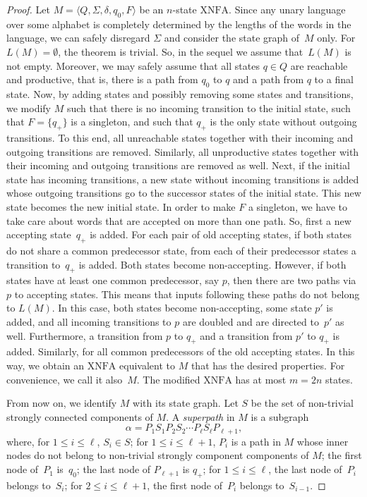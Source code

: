 \documentclass[final,copyright,noderivs]{eptcs}
\theoremstyle{plain}
\theoremstyle{definition}
\newcommand{\xnfa}{\textrm{XNFA}}
\begin{document}
\begin{proof}
Let $M=\langle Q,\Sigma,\delta,q_0,F\rangle$ be an $n$-state $\xnfa$.
Since any unary language over some alphabet is
completely determined by the lengths of the words in the language,
we can safely disregard $\Sigma$ and 
consider the state graph of~$M$ only. For $L(M)=\emptyset$, the theorem
is trivial. So, in the sequel we assume that~$L(M)$ is not empty.
Moreover, we may safely assume that all states $q\in Q$ are reachable and
productive, that is, there is a path from $q_0$ to $q$ and a path from
$q$ to a final state. Now, by adding states and possibly removing some states 
and transitions, we modify $M$ such that there is no incoming transition to 
the initial state, such that $F = \{q_+\}$ is a singleton, and such that $q_+$ is 
the only state without outgoing transitions. 
%
To this end, all unreachable states together with their incoming and outgoing transitions
are removed. Similarly, all unproductive states together with their incoming
and outgoing transitions
are removed as well. Next, if the initial state has incoming transitions, a
new state without incoming transitions is added whose outgoing transitions go to the successor
states of the initial state. This new state becomes the new initial state.
In order to make $F$ a singleton, we have to take care
about words that are accepted on more than one path. So, first 
a new accepting state~$q_+$ is added. 
%
For each pair of old accepting states, if both states do not share a common
predecessor state, from each of their predecessor states a transition 
to~$q_+$ is added. Both states become non-accepting. However, if both states have
at least one common predecessor, say $p$, then there are two paths via $p$ to
accepting states. This means that inputs following these paths do not belong
to $L(M)$. In this case, both states become non-accepting, some state $p'$ is
added, and all incoming transitions to $p$ are doubled and are directed 
to~$p'$ as well. Furthermore, a transition from $p$ to $q_+$
and a transition from $p'$ to $q_+$ is added. Similarly, for all common
predecessors of the old accepting states. In this way, we obtain an $\xnfa$
equivalent to $M$ that has the desired properties. For convenience, we call
it also~$M$. The modified $\xnfa$ has at most $m=2n$ states.

From now on, we identify $M$ with its state graph.
Let $S$ be the set of non-trivial strongly connected components of $M$.
A \emph{superpath} in $M$ is a subgraph
$$
\alpha = P_1 S_1 P_2 S_2 \cdots P_\ell S_{\ell} P_{\ell+1},
$$ 
where, 
for $1\leq i \leq \ell$, $S_i \in S$;
for $1\leq i \leq \ell+1$, $P_i$ is a path in $M$ whose inner nodes do not
belong to non-trivial strongly component components of $M$;
the first node of~$P_1$ is~$q_0$; 
the last node of $P_{\ell+1}$ is $q_+$; 
for $1\leq i \leq \ell$, the last node of~$P_i$ belongs to~$S_i$;
for $2\leq i \leq \ell+1$, the first node of~$P_i$ belongs to~$S_{i-1}$.


\end{proof}
\end{document}
